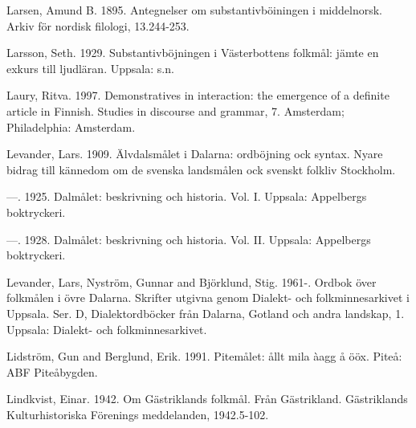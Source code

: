 Larsen, Amund B. 1895. Antegnelser om substantivböiningen i middelnorsk. Arkiv för nordisk filologi, 13.244-253.


Larsson, Seth. 1929. Substantivböjningen i Västerbottens folkmål: jämte en exkurs till ljudläran. Uppsala: s.n.


Laury, Ritva. 1997. Demonstratives in interaction: the emergence of a definite article in Finnish. Studies in discourse and grammar, 7. Amsterdam; Philadelphia: Amsterdam.


Levander, Lars. 1909. Älvdalsmålet i Dalarna: ordböjning ock syntax. Nyare bidrag till kännedom om de svenska landsmålen ock svenskt folkliv Stockholm.


—. 1925. Dalmålet: beskrivning och historia. Vol. I. Uppsala: Appelbergs boktryckeri.


—. 1928. Dalmålet: beskrivning och historia. Vol. II. Uppsala: Appelbergs boktryckeri.


Levander, Lars, Nyström, Gunnar and Björklund, Stig. 1961-. Ordbok över folkmålen i övre Dalarna. Skrifter utgivna genom Dialekt- och folkminnesarkivet i Uppsala. Ser. D, Dialektordböcker från Dalarna, Gotland och andra landskap, 1. Uppsala: Dialekt- och folkminnesarkivet.


Lidström, Gun and Berglund, Erik. 1991. Pitemålet: ållt mila àagg å ööx. Piteå: ABF Piteåbygden.


Lindkvist, Einar. 1942. Om Gästriklands folkmål. Från Gästrikland. Gästriklands Kulturhistoriska Förenings meddelanden, 1942.5-102.


